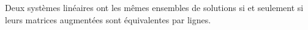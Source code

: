 Deux systèmes linéaires ont les mêmes ensembles de solutions si et seulement si leurs matrices augmentées sont équivalentes par lignes.

\begin{reponses}
\end{reponses}

